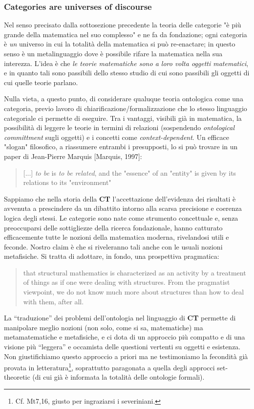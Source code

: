 \documentclass{amsart}
\begin{document}
\subsubsection{Categories are universes of discourse}
Nel senso precisato dalla sottosezione precedente la teoria delle categorie "è più grande della matematica nel suo complesso" e ne fa da fondazione; ogni categoria è \emph{un} universo in cui la totalità della matematica si può re-enactare; in questo senso è un metalinguaggio dove è possibile rifare la matematica nella sua interezza. L'idea è che \emph{le teorie matematiche sono a loro volta oggetti matematici}, e in quanto tali sono passibili dello stesso studio di cui sono passibili gli oggetti di cui quelle teorie parlano.

Nulla vieta, a questo punto, di considerare qualuque teoria ontologica come una categoria, previo lavoro di chiarificazione/formalizzazione che lo stesso linguaggio categoriale ci permette di eseguire. Tra i vantaggi, visibili già in matematica, la possibilità di leggere le teorie in termini di relazioni (sospendendo \emph{ontological committment} sugli oggetti) e i concetti come \emph{context-dependent}. Un efficace "slogan" filosofico, a riassumere entrambi i presupposti, lo si può trovare in un paper di Jean-Pierre Marquis [Marquis, 1997]:
	 \begin{quote}
	 	[...] \emph{to be} is \emph{to be related}, and the "essence" of an "entity" is given by its relations to its "environment"
	 \end{quote}
Sappiamo che nella storia della \textbf{CT} l'accettazione dell'evidenza dei risultati è avvenuta a prescindere da un dibattito intorno alla scarsa precisione e coerenza logica degli stessi. Le categorie sono nate come strumento concettuale e, senza preoccuparsi delle sottigliezze della ricerca fondazionale, hanno catturato efficacemente tutte le nozioni della matematica moderna, rivelandosi utili e feconde. Nostro claim è che si riveleranno tali anche con le usuali nozioni metafisiche. Si tratta di adottare, in fondo, una prospettiva pragmatica:
	  \begin{quote}
	  	that structural mathematics is characterized as an activity by a treatment of things as if one were dealing with structures. From the pragmatist viewpoint, we do not know much more about structures than how to deal with them, after all.
	  \end{quote}
La ``traduzione'' dei problemi dell'ontologia nel linguaggio di \textbf{CT} permette di manipolare meglio nozioni (non solo, come si sa, matematiche) ma metamatematiche e metafisiche, e ci dota di un approccio più compatto e di una visione più ``leggera'' e occamista delle questioni vertenti su oggetti e esistenza. Non giustifichiamo questo approccio a priori ma ne testimoniamo la fecondità già provata in letteratura\footnote{Cf. Mt7,16, giusto per ingraziarsi i severiniani.}, soprattutto paragonata a quella degli approcci set-theoretic (di cui già è informata la totalità delle ontologie formali).
	 
\end{document}
